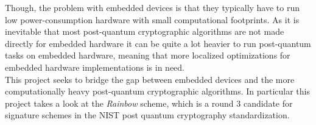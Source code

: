 Though, the problem with embedded devices is that they typically have to run low power-consumption hardware with small computational footprints. As it is inevitable that most post-quantum cryptographic algorithms are not made directly for embedded hardware it can be quite a lot heavier to run post-quantum tasks on embedded hardware, meaning that more localized optimizations for embedded hardware implementations is in need.\medskip\\
This project seeks to bridge the gap between embedded devices and the more computationally heavy post-quantum cryptographic algorithms. In particular this project takes a look at the \textit{Rainbow} scheme, which is a round 3 candidate for signature schemes in the NIST post quantum cryptography standardization.
\pagebreak